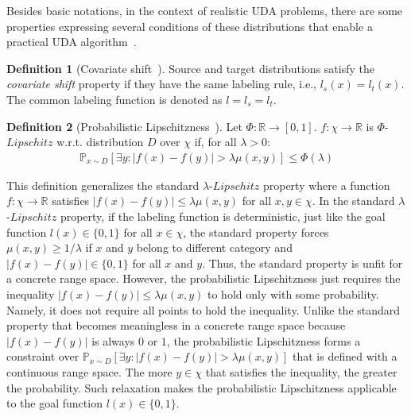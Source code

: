 \documentclass[journal,twocolumn]{IEEEtran}
\theoremstyle{definition}
\newtheorem{definition}{Definition}
\begin{document}
Besides basic notations, in the context of realistic UDA problems, there are some properties expressing several conditions of these distributions that enable a practical UDA algorithm~\cite{Ben-David2014}.
\begin{definition}[Covariate shift~\cite{Sugiyama05generalizationerror}]
Source and target distributions satisfy the \textit{covariate shift} property if they have the same labeling rule, i.e., $l_s(x)=l_t(x)$. The common labeling function is denoted as $l=l_s=l_t$.
\label{def1}
\end{definition}
 
\begin{definition}[Probabilistic Lipschitzness~\cite{Ben-David2014}]
Let $\Phi: \mathbb{R}\rightarrow[0, 1]$. $f:\chi\rightarrow\mathbb{R}$ is $\Phi$-$Lipschitz$ w.r.t. distribution $D$ over $\chi$ if, for all $\lambda>0$:
\begin{align}
\mathbb{P}_{x\sim D}[\exists y: |f(x)-f(y)|>\lambda\mu(x,y)]\leq\Phi(\lambda)\label{eq1}
\end{align}
\label{def2}
\end{definition}
This definition generalizes the standard $\lambda$-$Lipschitz$ property where a function $f:\chi\rightarrow\mathbb{R}$ satisfies $|f(x) - f(y)|\leq\lambda\mu(x, y)$ for all $x, y\in\chi$. In the standard $\lambda$-$Lipschitz$ property, if the labeling function is deterministic, just like the goal function $l(x)\in\{0,1\}$ for all $x\in\chi$, the standard property forces $\mu(x,y)\geq1/\lambda$ if $x$ and $y$ belong to different category and $|f(x) - f(y)|\in\{0,1\}$ for all $x$ and $y$. Thus, the standard property is unfit for a concrete range space. However, the probabilistic Lipschitzness just requires the inequality $|f(x) - f(y)|\leq\lambda\mu(x, y)$ to hold only with some probability. Namely,  it does not require all points to hold the inequality. Unlike the standard property that becomes meaningless in a concrete range space because $|f(x) - f(y)|$ is always $0$ or $1$, the probabilistic Lipschitzness forms a constraint over $\mathbb{P}_{x\sim D}[\exists y: |f(x)-f(y)|>\lambda\mu(x,y)]$ that is defined with a continuous range space. The more $y\in\chi$ that satisfies the inequality, the greater the probability. Such relaxation makes  the probabilistic Lipschitzness applicable to the goal function $l(x)\in\{0,1\}$.
\end{document}
